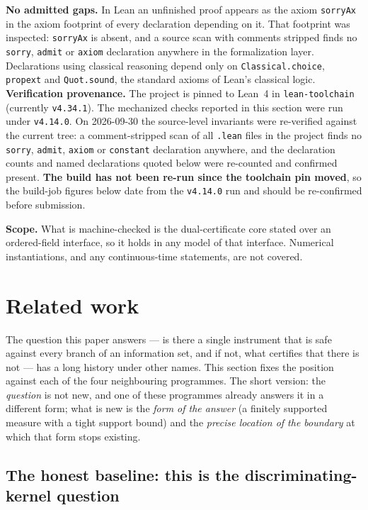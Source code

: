 \documentclass[10pt,twocolumn]{article}
\theoremstyle{plain}
\theoremstyle{definition}
\theoremstyle{remark}
\begin{document}
\noindent\textbf{No admitted gaps.} In Lean an unfinished proof appears as the axiom
\texttt{sorryAx} in the axiom footprint of every declaration depending on it. That
footprint was inspected: \texttt{sorryAx} is absent, and a source scan with comments
stripped finds no \texttt{sorry}, \texttt{admit} or \texttt{axiom} declaration anywhere in
the formalization layer. Declarations using classical reasoning depend only on \texttt{Classical.choice}, \texttt{propext} and \texttt{Quot.sound}, the standard axioms of Lean's classical logic.
\noindent\textbf{Verification provenance.} The project is pinned to Lean~4 in
\texttt{lean-toolchain} (currently \texttt{v4.34.1}). The mechanized checks reported in this
section were run under \texttt{v4.14.0}. On 2026-09-30 the source-level invariants were
re-verified against the current tree: a comment-stripped scan of all \texttt{.lean} files in
the project finds no \texttt{sorry}, \texttt{admit}, \texttt{axiom} or \texttt{constant}
declaration anywhere, and the declaration counts and named declarations quoted below were
re-counted and confirmed present. \textbf{The build has not been re-run since the toolchain
pin moved}, so the build-job figures below date from the \texttt{v4.14.0} run and should be
re-confirmed before submission.


\noindent\textbf{Scope.} What is machine-checked is the dual-certificate core stated over
an ordered-field interface, so it holds in any model of that interface. Numerical
instantiations, and any continuous-time statements, are not covered.

\section{Related work}
\label{dual-priorart}

The question this paper answers --- is there a single instrument that is safe against every
branch of an information set, and if not, what certifies that there is not --- has a long
history under other names. This section fixes the position against each of the four
neighbouring programmes. The short version: the \emph{question} is not new, and one of these
programmes already answers it in a different form; what is new is the \emph{form of the
answer} (a finitely supported measure with a tight support bound) and the \emph{precise
location of the boundary} at which that form stops existing.

\subsection{The honest baseline: this is the discriminating-kernel question}
\end{document}
